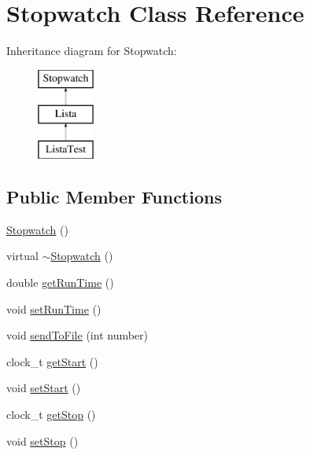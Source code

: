 \hypertarget{class_stopwatch}{\section{Stopwatch Class Reference}
\label{class_stopwatch}
}
Inheritance diagram for Stopwatch\-:\begin{figure}[H]
\begin{center}
\leavevmode
\includegraphics[height=3.000000cm]{class_stopwatch}
\end{center}
\end{figure}
\subsection*{Public Member Functions}
\begin{DoxyCompactItemize}
\item 
\hyperlink{class_stopwatch_a628b5ebeed5df065dd847e68fb6336cf}{Stopwatch} ()
\item 
virtual \hyperlink{class_stopwatch_a534c433482f8fe8144c91c0fe37aac20}{$\sim$\-Stopwatch} ()
\item 
double \hyperlink{class_stopwatch_a94fa586bb50e66c8713567b3c3d49363}{get\-Run\-Time} ()
\item 
void \hyperlink{class_stopwatch_affb208f2087bb95be62232adf117ebea}{set\-Run\-Time} ()
\item 
void \hyperlink{class_stopwatch_aac06497444e903787e2e8ba1db655485}{send\-To\-File} (int number)
\item 
clock\-\_\-t \hyperlink{class_stopwatch_ae85311604f23b21dabd7278f98f85982}{get\-Start} ()
\item 
void \hyperlink{class_stopwatch_a96e09b8ef0f10f11f1dc706e0f028464}{set\-Start} ()
\item 
clock\-\_\-t \hyperlink{class_stopwatch_a056cb3dedc2fbb7c415e5960d84d60d8}{get\-Stop} ()
\item 
void \hyperlink{class_stopwatch_a1d7ba5e1ccd82dedc13ebaf9a7c444ab}{set\-Stop} ()
\end{DoxyCompactItemize}


